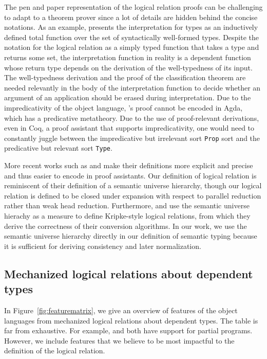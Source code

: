 \documentclass[acmsmall,screen=true,
\ifpublic review=false\else,review=true\fi
  ,anonymous=\ifanonymous true\else false\fi]{acmart}
\begin{document}
The pen and paper representation of the logical relation proofs
can be challenging to adapt to a theorem prover since a lot of details
are hidden behind the concise notations.
As an example, \citet{geuvers1994short} presents the interpretation for types as
an inductively defined total function over the set of syntactically
well-formed types. Despite the notation for the logical relation as a
simply typed function that takes a type and returns some set, the
interpretation function in reality is a dependent function whose
return type depends on the derivation of the well-typedness of its
input. The well-typedness derivation and the proof of the
classification theorem are needed relevantly in the body
of the interpretation function to decide whether an argument of an
application should be erased during interpretation. Due to the
impredicativity of the object language, \citet{geuvers1994short}'s
proof cannot be encoded in Agda, which has a predicative
metatheory. Due to the use of proof-relevant derivations, even in
Coq, a proof assistant that supports impredicativity, one would need
to constantly juggle between the impredicative but irrelevant sort
\texttt{Prop} sort and the predicative but relevant sort
\texttt{Type}.

More recent works such as \citet{Abel12}
and\citet{abel2008betaeta} make their definitions more explicit and
precise and thus easier to encode in proof assistants. Our definition
of logical relation is reminiscent of their definition of a
semantic universe hierarchy, though our logical relation is defined to
be closed under expansion with respect to parallel reduction rather
than weak head reduction. Furthermore, \citet{Abel12} and
\citet{abel2008betaeta} use the semantic universe hierachy as a
measure to define Kripke-style logical relations, from which they
derive the correctness of their conversion algorithms. In our work, we
use the semantic universe hierarchy directly in our definition of
semantic typing because it is sufficient
for deriving consistency and later normalization.

\subsection{Mechanized logical relations about dependent types}
In Figure~\ref{fig:featurematrix}, we give an overview of features of
the object languages from mechanized logical relations about dependent
types. The table is far from exhaustive. For example,
\citet{casinghino:combining-proofs-programs} and
\citet{anand2014towards} both have support for partial
programs. However, we include features that we believe to be most
impactful to the definition of the logical relation.
\end{document}
